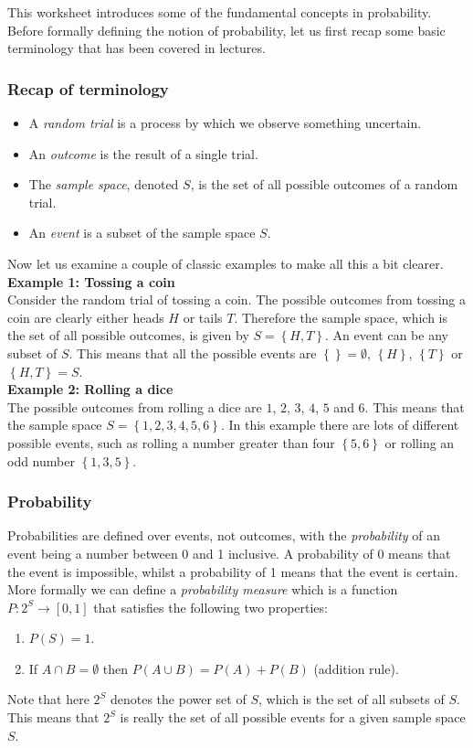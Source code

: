 This worksheet introduces some of the fundamental concepts in probability. Before formally defining the notion of probability, let us first recap some basic terminology that has been covered in lectures.\\

\subsubsection*{Recap of terminology}
\begin{itemize}
 \item A {\em random trial} is a process by which we observe something uncertain.
 \item An {\em outcome} is the result of a single trial.
 \item The {\em sample space}, denoted $S$, is the set of all possible outcomes of a random trial.
 \item An {\em event} is a subset of the sample space $S$.
\end{itemize}
Now let us examine a couple of classic examples to make all this a bit clearer.\\

{\bf Example 1: Tossing a coin}\\
Consider the random trial of tossing a coin. The possible outcomes from tossing a coin are clearly either heads $ H$ or tails $ T $. Therefore the sample space, which is the set of all possible outcomes, is given by $S=\left\{H,T\right\}$. An event can be any subset of $S$. This means that all the possible events are $\left\{  \right\}=\emptyset$, $\left\{ H \right\}$, $\left\{ T \right\}$ or $\left\{ H,T \right\}=S$. \\

{\bf  Example 2: Rolling a dice}\\
The possible outcomes from rolling a dice are $1$, $2$, $3$, $4$, $5$ and $6$. This means that the sample space $S=\left\{1,2,3,4,5,6\right\}$. In this example there are lots of different possible events, such as rolling a number greater than four $\left\{ 5,6 \right\}$ or rolling an odd number $\left\{ 1,3,5 \right\}$.

\subsubsection*{Probability}
Probabilities are defined over events, not outcomes, with the {\em probability} of an event being a number between 0 and 1 inclusive. A probability of 0 means that the event is impossible, whilst a probability of 1 means that the event is certain. More formally we can define a {\em probability measure} which is a function $P:2^{S}\to[0,1]$ that satisfies the following two properties:
\begin{enumerate}
 \item $P(S)=1$.
 \item If $A\cap B = \emptyset$ then $P(A\cup B)=P(A)+P(B)$ (addition rule).
\end{enumerate}
Note that here $2^{S}$ denotes the power set of $S$, which is the set of all subsets of $S$. This means that $2^{S}$ is really the set of all possible events for a given sample space $S$.


